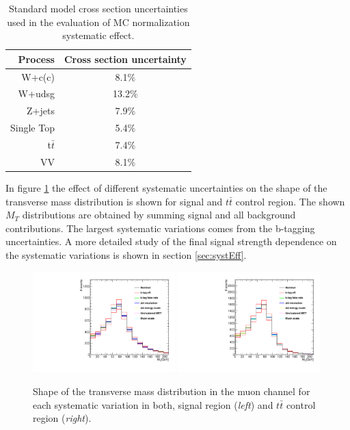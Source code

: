 \begin{table}[!htb]
\begin{center}
   \begin{tabular} {r c} \hline \hline
        Process         & Cross section uncertainty \\
        \hline
        W+c(c)          & 8.1$\%$ \\
        W+udsg          & 13.2$\%$ \\
        Z+jets          & 7.9$\%$ \\
        Single Top      & 5.4$\%$ \\
        t$\bar{t}$      & 7.4$\%$ \\
        VV              & 8.1$\%$ \\
        \hline\hline
   \end{tabular}
\caption{Standard model cross section uncertainties used in the evaluation of MC normalization systematic effect.}
\label{tab:SMunc}
\end{center}
\end{table}

In figure \ref{fig:shapeVar} the effect of different systematic uncertainties on the shape of the transverse mass distribution is shown for signal and $t\bar{t}$ control region. The shown $M_T$ distributions are obtained by summing signal and all background contributions. The largest systematic variations comes from the b-tagging uncertainties. A more detailed study of the final signal strength dependence on the systematic variations is shown in section \ref{sec:systEff}.

\begin{figure}[htbp]
	\centering
		\includegraphics[width=0.49\textwidth]{Figures/syst_Wbb_var.pdf}
		\includegraphics[width=0.49\textwidth]{Figures/syst_TT_var.pdf}
	\caption[Shape of the transverse mass distribution for each systematic variation in both, signal region and $t\bar{t}$ control region.]{Shape of the transverse mass distribution in the muon channel for each systematic variation in both, signal region (\textit{left}) and $t\bar{t}$ control region (\textit{right}).}
	\label{fig:shapeVar}
\end{figure}

